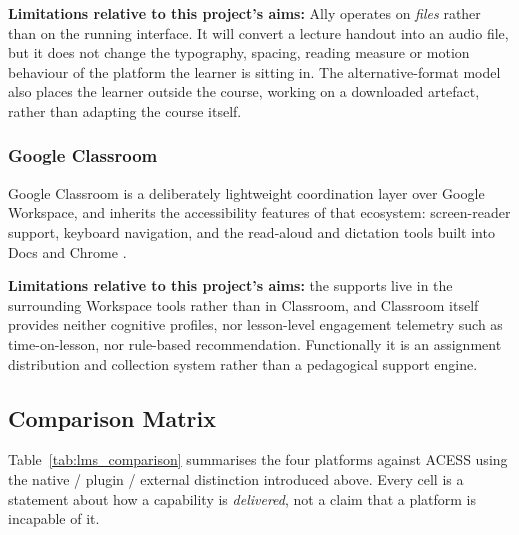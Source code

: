 \documentclass[12pt, oneside]{article} %
\begin{document}
\textbf{Limitations relative to this project's aims:} Ally operates on \emph{files} rather than on the running interface. It will convert a lecture handout into an audio file, but it does not change the typography, spacing, reading measure or motion behaviour of the platform the learner is sitting in. The alternative-format model also places the learner outside the course, working on a downloaded artefact, rather than adapting the course itself.

\subsubsection{Google Classroom}
Google Classroom is a deliberately lightweight coordination layer over Google Workspace, and inherits the accessibility features of that ecosystem: screen-reader support, keyboard navigation, and the read-aloud and dictation tools built into Docs and Chrome \cite{google_classroom_accessibility,google_classroom}.

\textbf{Limitations relative to this project's aims:} the supports live in the surrounding Workspace tools rather than in Classroom, and Classroom itself provides neither cognitive profiles, nor lesson-level engagement telemetry such as time-on-lesson, nor rule-based recommendation. Functionally it is an assignment distribution and collection system rather than a pedagogical support engine.

\subsection{Comparison Matrix}

Table~\ref{tab:lms_comparison} summarises the four platforms against ACESS using the native / plugin / external distinction introduced above. Every cell is a statement about how a capability is \emph{delivered}, not a claim that a platform is incapable of it.
\end{document}
